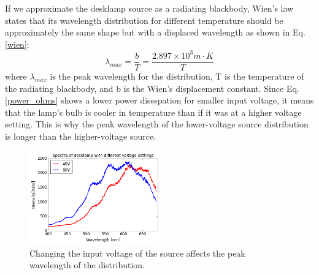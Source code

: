 \documentclass[authoryear, 12pt,5p, times]{elsarticle}
\begin{document}
If we approximate the desklamp source as a radiating blackbody, Wien's law states that its wavelength distribution for different temperature should be approximately the same shape but with a displaced wavelength as shown in Eq.\ref{wien}:
		\begin{equation}
		\lambda_{max} = \frac{b}{T}=\frac{2.897\times 10^3 m\cdot K}{T}
		\label{wien}
		\end{equation}
		where $\lambda_{max}$ is the peak wavelength for the distribution, T is the temperature of the radiating blackbody, and b is the Wien's displacement constant.
		Since Eq. \ref{power_ohms} shows a lower power dissspation for smaller input voltage, it means that the lamp's bulb is cooler in temperature than if it was at a higher voltage setting. This is why the peak wavelength of the  lower-voltage source distribution is longer than the higher-voltage source. %
	\begin{figure}[h!]
	\includegraphics[width=0.5\textwidth]{figures/voltage}
\caption{Changing the input voltage of the source affects the peak wavelength of the distribution. }

\label{voltage}
	\end{figure}
\end{document}

